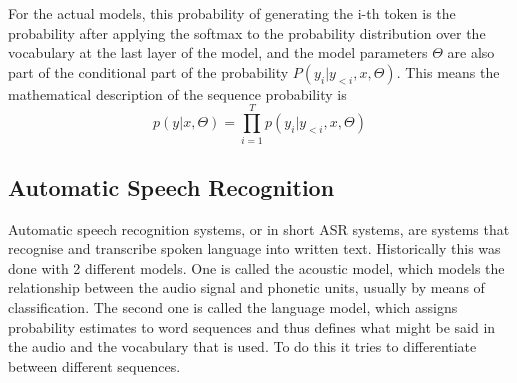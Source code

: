 For the actual models, this probability of generating the i-th token is the probability after applying the softmax to the probability distribution over the vocabulary at the last layer of the model, and the model parameters $\Theta$ are also part of the conditional part of the probability $P(y_i|y_{<i}, x, \Theta)$. This means the mathematical description of the sequence probability is $$p(y|x,\Theta)=\prod_{i=1}^T p(y_i|y_{<i}, x, \Theta) $$


\subsection{Automatic Speech Recognition}
Automatic speech recognition systems, or in short ASR systems, are systems that recognise and transcribe spoken language into written text.
Historically this was done with 2 different models. One is called the acoustic model, which models the relationship between the audio signal and phonetic units, usually by means of classification. 
The second one is called the language model, which assigns probability estimates to word sequences and thus defines what might be said in the audio and the vocabulary that is used.  
To do this it tries to differentiate between different sequences. \cite{understandingasr}

